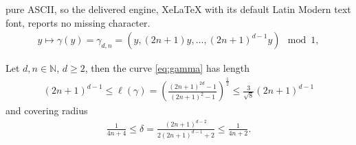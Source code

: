 \documentclass[10pt,a4paper]{amsart}
\newcommand{\N}{\ensuremath{\mathbb{N}}}
\begin{document}
pure ASCII, so the delivered engine, XeLaTeX with its default Latin Modern text font, reports no missing character.
\begin{align}\label{eq:gamma}
    y\mapsto \gamma(y)=\gamma_{d,n}=\left(y,(2n+1)y,\hdots,(2n+1)^{d-1} y\right) \mod 1,
\end{align}

\begin{lemma}\label{thm:gamma2}
 Let $d,n\in\N$, $d\ge 2$, then the curve \eqref{eq:gamma} has length
 \begin{align*}
    (2n+1)^{d-1}\le
    \ell(\gamma)
    =\left(\frac{(2n+1)^{2d}-1}{(2n+1)^2-1}\right)^{\frac12}
    \le \frac{3}{\sqrt{8}} (2n+1)^{d-1}
\end{align*}
and covering radius
\begin{align*}
    \frac{1}{4n+4} \le \delta = \frac{(2n+1)^{d-2}}{2(2n+1)^{d-1}+2} \le \frac{1}{4n+2}.
\end{align*}
\end{lemma}
\end{document}
